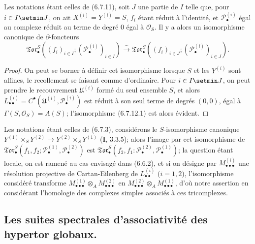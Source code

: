 \begin{proposition}[6.7.12]
Les notations étant celles de (6.7.11), soit $J$ une partie de $I$ telle que,
pour $i\in I\setmin J$, on ait $X^{(i)}=Y^{(i)}=S$, $f_i$ étant réduit à l'identité,
et $\mathscr P_\bullet^{(i)}$ égal au complexe réduit au terme de degré $0$
égal à $\mathscr O_S$. Il y a alors un isomorphisme canonique de
$\partial$-foncteurs
\[
  \mathfrak{Tor}_\bullet^S
  ((f_i)_{i\in I};(\mathscr P_\bullet^{(i)})_{i\in I})
  \xrightarrow{\sim}
  \mathfrak{Tor}_\bullet^S
  ((f_i)_{i\in J};(\mathscr P_\bullet^{(i)})_{i\in J}).
  \tag{6.7.12.1}\label{III.6.7.12.1.fr}
\]
\end{proposition}

\begin{proof}
On peut se borner à définir cet isomorphisme lorsque $S$ et les $Y^{(i)}$
sont affines, le recollement se faisant comme d'ordinaire. Pour $i\in I\setmin J$,
on peut prendre le recouvrement $\mathfrak U^{(i)}$ formé du seul ensemble
$S$, et alors
$L_{\bullet\bullet}^{(i)}=C^\bullet(\mathfrak U^{(i)},
\mathscr P_\bullet^{(i)})$ est réduit à son seul terme de degrés $(0,0)$,
égal à $\Gamma(S,\mathscr O_S)=A(S)$; l'isomorphisme (6.7.12.1) est alors
évident.
\end{proof}

\begin{remark}[6.7.13]
Les notations étant celles de (6.7.3), considérons le $S$-isomorphisme
canonique
$Y^{(1)}\times_S Y^{(2)}\to Y^{(2)}\times_S Y^{(1)}$ (\textbf{I}, 3.3.5); alors
l'image par cet isomorphisme de
$\mathfrak{Tor}_\bullet^S(f_1,f_2;
\mathscr P_\bullet^{(1)},\mathscr P_\bullet^{(2)})$ est
$\mathfrak{Tor}_\bullet^S(f_2,f_1:
\mathscr P_\bullet^{(2)},\mathscr P_\bullet^{(1)})$; la question étant
locale, on est ramené au cas envisagé dans (6.6.2), et si on désigne par
$M_{\bullet\bullet\bullet}^{(i)}$ une résolution projective de
Cartan-Eilenberg de $L_{\bullet\bullet}^{(i)}$ ($i=1,2$), l'isomorphisme
considéré transforme
$M_{\bullet\bullet\bullet}^{(1)}\otimes_A
M_{\bullet\bullet\bullet}^{(2)}$ en
$M_{\bullet\bullet\bullet}^{(2)}\otimes_A
M_{\bullet\bullet\bullet}^{(1)}$, d'où notre assertion en considérant
l'homologie des complexes simples associés à ces tricomplexes.
\end{remark}

\subsection{Les suites spectrales d'associativité des hypertor globaux.}

